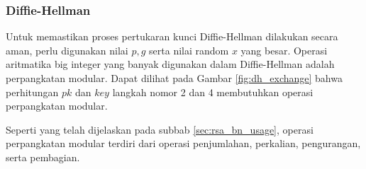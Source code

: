 \subsubsection{Diffie-Hellman}
Untuk memastikan proses pertukaran kunci Diffie-Hellman dilakukan secara aman, perlu digunakan nilai $p, g$ serta nilai random $x$ yang besar. Operasi aritmatika big integer yang banyak digunakan dalam Diffie-Hellman adalah perpangkatan modular. Dapat dilihat pada Gambar \ref{fig:dh_exchange} bahwa perhitungan $pk$ dan $key$ langkah nomor 2 dan 4 membutuhkan operasi perpangkatan modular.

Seperti yang telah dijelaskan pada subbab \ref{sec:rsa_bn_usage}, operasi perpangkatan modular terdiri dari operasi penjumlahan, perkalian, pengurangan, serta pembagian.
